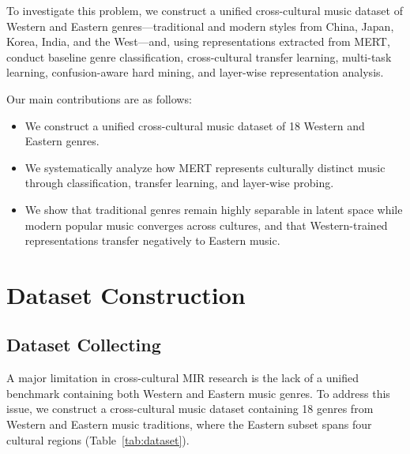 \documentclass{article}
\begin{document}
To investigate this problem, we construct a unified cross-cultural music dataset of Western and Eastern genres---traditional and modern styles from China, Japan, Korea, India, and the West---and, using representations extracted from MERT, conduct baseline genre classification, cross-cultural transfer learning, multi-task learning, confusion-aware hard mining, and layer-wise representation analysis.

Our main contributions are as follows:
\begin{itemize}[leftmargin=*]
 \item We construct a unified cross-cultural music dataset of 18 Western and Eastern genres.

 \item We systematically analyze how MERT represents culturally distinct music through classification, transfer learning, and layer-wise probing.

 \item We show that traditional genres remain highly separable in latent space while modern popular music converges across cultures, and that Western-trained representations transfer negatively to Eastern music.
\end{itemize}

\section{Dataset Construction}
\subsection{Dataset Collecting}

A major limitation in cross-cultural MIR research is the lack of a unified benchmark containing both Western and Eastern music genres. To address this issue, we construct a cross-cultural music dataset containing 18 genres from Western and Eastern music traditions, where the Eastern subset spans four cultural regions (Table~\ref{tab:dataset}).
\end{document}
